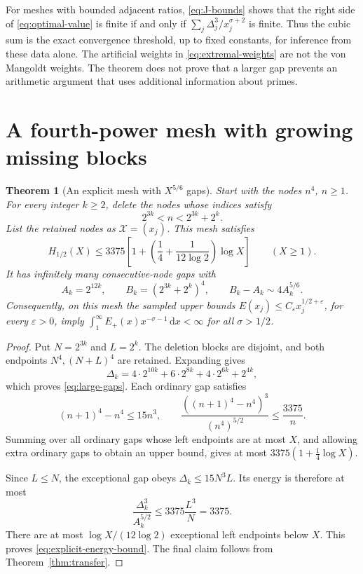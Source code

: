\documentclass[11pt]{article}
\newtheorem{theorem}{Theorem}[section]
\theoremstyle{definition}
\newcommand{\ep}{\varepsilon}
\newcommand{\mesh}{\mathcal X}
\newcommand{\dd}{\,\mathrm d}
\begin{document}
For meshes with bounded adjacent ratios, \eqref{eq:J-bounds} shows that
the right side of \eqref{eq:optimal-value} is finite if and only if
\(\sum_j\Delta_j^3/x_j^{\sigma+2}\) is finite. Thus the cubic sum is
the exact convergence threshold, up to fixed constants, for inference
from these data alone. The artificial weights in
\eqref{eq:extremal-weights} are not the von Mangoldt weights. The theorem
does not prove that a larger gap prevents an arithmetic argument that
uses additional information about primes.

\section{A fourth-power mesh with growing missing blocks}
\label{sec:deletions}

\begin{theorem}[An explicit mesh with \(X^{5/6}\) gaps]\label{thm:deletion}
Start with the nodes \(n^4\), \(n\geq1\). For every integer \(k\geq2\),
delete the nodes whose indices satisfy
\begin{equation}\label{eq:deleted-indices}
 2^{3k}<n<2^{3k}+2^k.
\end{equation}
List the retained nodes as \(\mesh=(x_j)\). This mesh satisfies
\begin{equation}\label{eq:explicit-energy-bound}
 H_{1/2}(X)\leq3375\left[1+
       \left(\frac14+\frac1{12\log2}\right)\log X\right]
 \qquad(X\geq1).
\end{equation}
It has infinitely many consecutive-node gaps with
\begin{equation}\label{eq:large-gaps}
 A_k=2^{12k},\qquad B_k=(2^{3k}+2^k)^4,\qquad
 B_k-A_k\sim4A_k^{5/6}.
\end{equation}
Consequently, on this mesh the sampled upper bounds
\(E(x_j)\leq C_\ep x_j^{1/2+\ep}\), for every \(\ep>0\), imply
\(\int_1^\infty E_+(x)x^{-\sigma-1}\dd x<\infty\) for all
\(\sigma>1/2\).
\end{theorem}
\begin{proof}
Put \(N=2^{3k}\) and \(L=2^k\). The deletion blocks are disjoint,
and both endpoints \(N^4,(N+L)^4\) are retained. Expanding gives
\begin{equation}\label{eq:gap-polynomial}
 \Delta_k=4\cdot2^{10k}+6\cdot2^{8k}
                 +4\cdot2^{6k}+2^{4k},
\end{equation}
which proves \eqref{eq:large-gaps}. Each ordinary gap satisfies
\[
 (n+1)^4-n^4\leq15n^3,
 \qquad
 \frac{((n+1)^4-n^4)^3}{(n^4)^{5/2}}\leq\frac{3375}{n}.
\]
Summing over all ordinary gaps whose left endpoints are at most \(X\),
and allowing extra ordinary gaps to obtain an upper bound, gives at most
\(3375(1+\tfrac14\log X)\).

Since \(L\leq N\), the exceptional gap obeys
\(\Delta_k\leq15N^3L\). Its energy is therefore at most
\[
 \frac{\Delta_k^3}{A_k^{5/2}}
 \leq3375\frac{L^3}{N}=3375.
\]
There are at most \(\log X/(12\log2)\) exceptional left endpoints
below \(X\). This proves \eqref{eq:explicit-energy-bound}.
The final claim follows from Theorem~\ref{thm:transfer}.
\end{proof}
\end{document}
